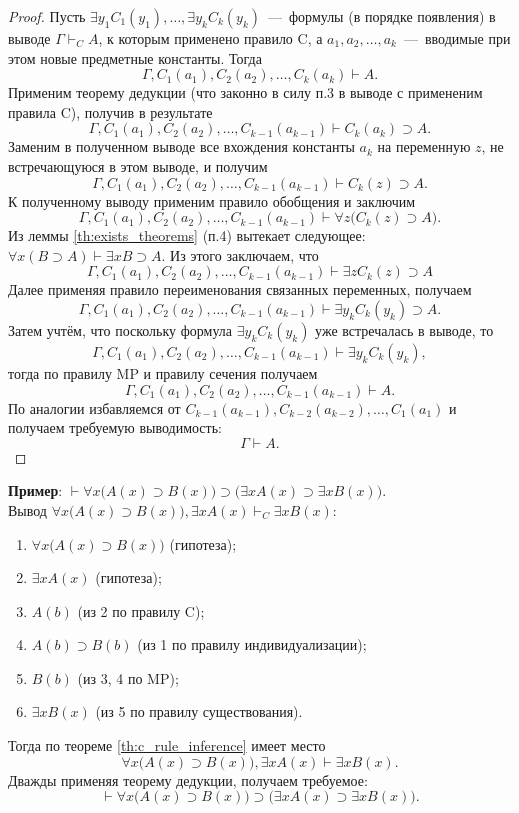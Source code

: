 \begin{proof}
    Пусть $\exists y_1C_1(y_1), \dots, \exists y_kC_k(y_k)$~---~формулы (в порядке появления) в выводе $\Gamma \vdash_C A$, к которым применено правило C, а $a_1, a_2, \dots, a_k$~---~вводимые при этом новые предметные константы. Тогда 
    \[
        \Gamma, C_1(a_1), C_2(a_2), \dots, C_k(a_k) \vdash A.
    \]
    Применим теорему дедукции (что законно в силу п.3 в выводе с примененим правила C), получив в результате 
    \[
        \Gamma, C_1(a_1), C_2(a_2), \dots, C_{k - 1}(a_{k - 1}) \vdash C_k(a_k) \supset A.
    \]
    Заменим в полученном выводе все вхождения константы $a_k$ на переменную $z$, не встречающуюся в этом выводе, и получим
    \[
        \Gamma, C_1(a_1), C_2(a_2), \dots, C_{k - 1}(a_{k - 1}) \vdash C_k(z) \supset A.
    \]
    К полученному выводу применим правило обобщения и заключим
    \[
        \Gamma, C_1(a_1), C_2(a_2), \dots, C_{k - 1}(a_{k - 1}) \vdash \forall z\big(C_k(z) \supset A\big).
    \]
    Из леммы \ref{th:exists_theorems} (п.4) вытекает следующее: $\forall x(B \supset A) \vdash \exists xB \supset A$. Из этого заключаем, что
    \[
        \Gamma, C_1(a_1), C_2(a_2), \dots, C_{k - 1}(a_{k - 1}) \vdash \exists zC_k(z) \supset A
    \]
    Далее применяя правило переименования связанных переменных, получаем
    \[
        \Gamma, C_1(a_1), C_2(a_2), \dots, C_{k - 1}(a_{k - 1}) \vdash \exists y_kC_k(y_k) \supset A.
    \]
    Затем учтём, что поскольку формула $\exists y_kC_k(y_k)$ уже встречалась в выводе, то 
    \[
        \Gamma, C_1(a_1), C_2(a_2), \dots, C_{k - 1}(a_{k - 1}) \vdash \exists y_kC_k(y_k),
    \]
    тогда по правилу MP и правилу сечения получаем
    \[
        \Gamma, C_1(a_1), C_2(a_2), \dots, C_{k - 1}(a_{k - 1}) \vdash A.
    \]
    По аналогии избавляемся от $C_{k - 1}(a_{k - 1}), C_{k - 2}(a_{k - 2}), \dots, C_1(a_1)$ и получаем требуемую выводимость:
    \[
        \Gamma \vdash A.
    \]
\end{proof}
\textbf{Пример}: $\vdash \forall x\big(A(x) \supset B(x)\big) \supset \big(\exists xA(x) \supset \exists xB(x)\big)$. \\
Вывод $\forall x\big(A(x) \supset B(x)\big), \exists xA(x) \vdash_C \exists xB(x)$:
\begin{enumerate}
    \item $\forall x\big(A(x) \supset B(x)\big)$ (гипотеза);
    \item $\exists xA(x)$ (гипотеза);
    \item $A(b)$ (из 2 по правилу C);
    \item $A(b) \supset B(b)$ (из 1 по правилу индивидуализации);
    \item $B(b)$ (из 3, 4 по MP);
    \item $\exists xB(x)$ (из 5 по правилу существования).
\end{enumerate}
Тогда по теореме \ref{th:c_rule_inference} имеет место
\[
    \forall x\big(A(x) \supset B(x)\big), \exists xA(x) \vdash \exists xB(x).
\]
Дважды применяя теорему дедукции, получаем требуемое:
\[
    \vdash \forall x\big(A(x) \supset B(x)\big) \supset \big(\exists xA(x) \supset \exists xB(x)\big).
\]